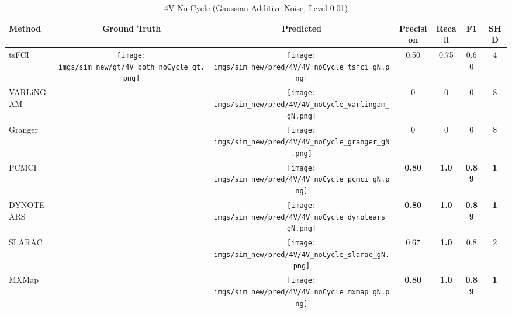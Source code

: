\begin{table}[htb]
\begin{tabular}{l|c|c|c|c|c|c}
Method    & Ground Truth      & Predicted & Precision     & Recall       & F1            & SHD        \\ \hline
tsFCI     & \multirow{7}{*}[-5em]{\begin{minipage}{.17\linewidth} \centering \texttt{[image: imgs/sim\_new/gt/4V\_both\_noCycle\_gt.png]} \end{minipage}} & \begin{minipage}{.17\linewidth} \centering \texttt{[image: imgs/sim\_new/pred/4V/4V\_noCycle\_tsfci\_gN.png]} \end{minipage} & 0.50          & 0.75         & 0.60          & 4          \\
VARLiNGAM &                   & \begin{minipage}{.17\linewidth} \centering \texttt{[image: imgs/sim\_new/pred/4V/4V\_noCycle\_varlingam\_gN.png]} \end{minipage} & 0             & 0            & 0             & 8          \\
Granger   &                   & \begin{minipage}{.17\linewidth} \centering \texttt{[image: imgs/sim\_new/pred/4V/4V\_noCycle\_granger\_gN.png]} \end{minipage} & 0             & 0            & 0             & 8          \\
PCMCI     &                   & \begin{minipage}{.17\linewidth} \centering \texttt{[image: imgs/sim\_new/pred/4V/4V\_noCycle\_pcmci\_gN.png]} \end{minipage} & \textbf{0.80} & \textbf{1.0} & \textbf{0.89} & \textbf{1} \\
DYNOTEARS &                   & \begin{minipage}{.17\linewidth} \centering \texttt{[image: imgs/sim\_new/pred/4V/4V\_noCycle\_dynotears\_gN.png]} \end{minipage} & \textbf{0.80} & \textbf{1.0} & \textbf{0.89} & \textbf{1} \\
SLARAC    &                   &  \begin{minipage}{.17\linewidth} \centering \texttt{[image: imgs/sim\_new/pred/4V/4V\_noCycle\_slarac\_gN.png]} \end{minipage} & 0.67          & \textbf{1.0} & 0.8           & 2          \\ \cline{1-1} \cline{3-7} 
MXMap     &                   & \begin{minipage}{.17\linewidth} \centering \texttt{[image: imgs/sim\_new/pred/4V/4V\_noCycle\_mxmap\_gN.png]} \end{minipage}  & \textbf{0.80} & \textbf{1.0} & \textbf{0.89} & \textbf{1}
\end{tabular}
\caption{4V No Cycle (Gaussian Additive Noise, Level 0.01)}
\label{tab:4V_noCycle_gN}
\end{table}

